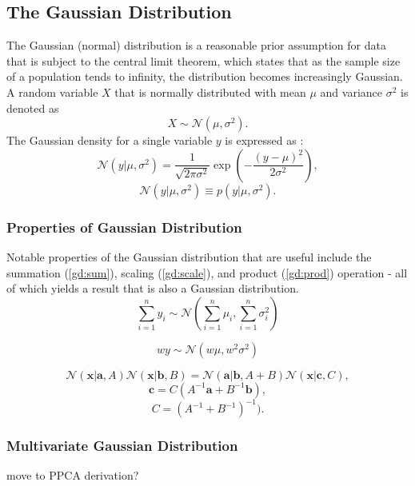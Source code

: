 \documentclass[ %
author={Dillon Keith Diep [INCOMPLETE DRAFT, NOT FOR SUBMISSION]},
supervisor={Dr. Carl Henrik Ek},
degree={MEng},
title={ARt-CG:},
subtitle={Assisted Real-time Content Generation of 3D Hair by Learning Manifolds},
type={Research},
year={2014} ]{dissertation}
\begin{document}
\subsection{The Gaussian Distribution}
The Gaussian (normal) distribution is a reasonable prior assumption for data that is subject to the central limit theorem, which states that as the sample size of a population tends to infinity, the distribution becomes increasingly Gaussian. \cite[p.78]{bishop}
A random variable $X$ that is normally distributed with mean $\mu$ and variance $\sigma^2$ is denoted as
$$X\sim\mathcal{N}(\mu, \sigma^2).$$
The Gaussian density for a single variable $y$ is expressed as \cite[p.78]{bishop}:
$$\mathcal{N}(y|\mu, \sigma^2)=\frac{1}{\sqrt{2\pi\sigma^2}}\exp\left(-\frac{(y-\mu)^2}{2\sigma^2}\right),$$
$$\mathcal{N}(y|\mu,\sigma^2) \equiv p(y|\mu,\sigma^2).$$

\subsubsection{Properties of Gaussian Distribution}
Notable properties of the Gaussian distribution that are useful include the summation (\ref{gd:sum}), scaling (\ref{gd:scale}), and product (\ref{gd:prod}) operation - all of which yields a result that is also a Gaussian distribution. \cite[p.200]{gp}
\begin{equation} \label{gd:sum}
\sum^n_{i=1}y_i\sim\mathcal{N}(\sum^n_{i=1}\mu_i,\sum^n_{i=1}\sigma^2_i)
\end{equation}

\begin{equation} \label{gd:scale}
wy\sim\mathcal{N}(w\mu,w^2\sigma^2)
\end{equation}

\begin{equation} \label{gd:prod}
\mathcal{N}(\bm{x|a},A)\mathcal{N}(\bm{x|b},B) = \mathcal{N}(\bm{a|b},A+B)\mathcal{N}(\bm{x}|\bm{c}, C),
\end{equation}
$$\bm{c}=C(A^{-1}\bm{a}+B^{-1}\bm{b}),$$
$$C = (A^{-1}+B^{-1})^{-1}).$$


\subsubsection{Multivariate Gaussian Distribution}
{\color{red} move to PPCA derivation? }
\end{document}
